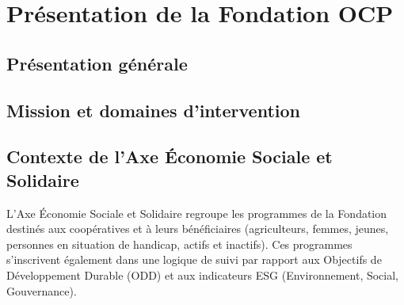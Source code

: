 \chapter{Présentation de la Fondation OCP}

\section{Présentation générale}

\section{Mission et domaines d'intervention}

\section{Contexte de l'Axe Économie Sociale et Solidaire}
L'Axe Économie Sociale et Solidaire regroupe les programmes de la Fondation destinés aux
coopératives et à leurs bénéficiaires (agriculteurs, femmes, jeunes, personnes en
situation de handicap, actifs et inactifs). Ces programmes s'inscrivent également dans
une logique de suivi par rapport aux Objectifs de Développement Durable (ODD) et aux
indicateurs ESG (Environnement, Social, Gouvernance).

